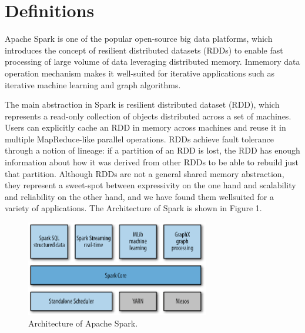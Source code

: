 \section{Definitions}\label{sec:definition}
\par  Apache Spark \cite{apachespark} is one of the popular open-source big data platforms, which introduces the concept of resilient distributed datasets (RDDs) \cite{apachespark}to enable fast processing of large volume of data leveraging distributed memory. Inmemory data operation mechanism makes it well-suited for iterative applications such as iterative machine learning and graph algorithms.
\par The main abstraction in Spark is resilient distributed dataset (RDD), which represents a read-only collection of objects distributed across a set of machines. Users can explicitly cache an RDD in memory across machines and reuse it in multiple MapReduce-like parallel operations. RDDs achieve fault tolerance through a notion of lineage: if a partition of an RDD is lost, the RDD has enough information about how it was derived from other RDDs to be able to rebuild just that partition. Although RDDs are not a general shared memory abstraction, they represent a sweet-spot between expressivity on the one hand and scalability and reliability on the other hand, and we have found them wellsuited for a variety of applications. The Architecture of Spark  is shown in Figure 1.
\par
\begin{figure}[h]
	\includegraphics[width=8cm]{1.eps}
	\caption{Architecture of Apache Spark.}\label{fig:ArchitectureSpark}
\end{figure}

